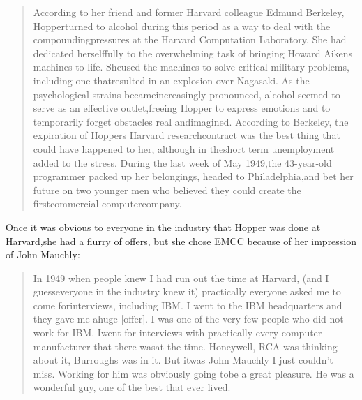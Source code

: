 \begin{quotation}
    According to her friend and former Harvard colleague Edmund Berkeley, Hopperturned to alcohol during this period as a way to deal with the compoundingpressures at the Harvard Computation Laboratory. She had dedicated herselffully to the overwhelming task of bringing Howard Aikens machines to life.  Sheused the machines to solve critical military problems, including one thatresulted in an explosion over Nagasaki.  As the psychological strains becameincreasingly pronounced, alcohol seemed to serve as an effective outlet,freeing Hopper to express emotions and to temporarily forget obstacles real andimagined.  According to Berkeley, the expiration of Hoppers Harvard researchcontract was the best thing that could have happened to her, although in theshort term unemployment added to the stress.  During the last week of May 1949,the 43-year-old programmer packed up her belongings, headed to Philadelphia,and bet her future on two younger men who believed they could create the firstcommercial computercompany.
    \cite{grace_hopper_and_the_invention_of_the_information_age_2009}
\end{quotation}Once it was obvious to everyone in the industry that Hopper was done at Harvard,she had a flurry of offers, but she chose EMCC because of her impression of John Mauchly:
\begin{quotation}In 1949 when people knew I had run out the time at Harvard, (and I guesseveryone in the industry knew it) practically everyone asked me to come forinterviews, including IBM. I went to the IBM headquarters and they gave me ahuge [offer].  I was one of the very few people who did not work for IBM. Iwent for interviews with practically every computer manufacturer that there wasat the time. Honeywell, RCA was thinking about it, Burroughs was in it.  But itwas John Mauchly I just couldn't miss. Working for him was obviously going tobe a great pleasure. He was a wonderful guy, one of the best that ever lived.
    \cite{Hopper_1980_Oral_History}
\end{quotation}

